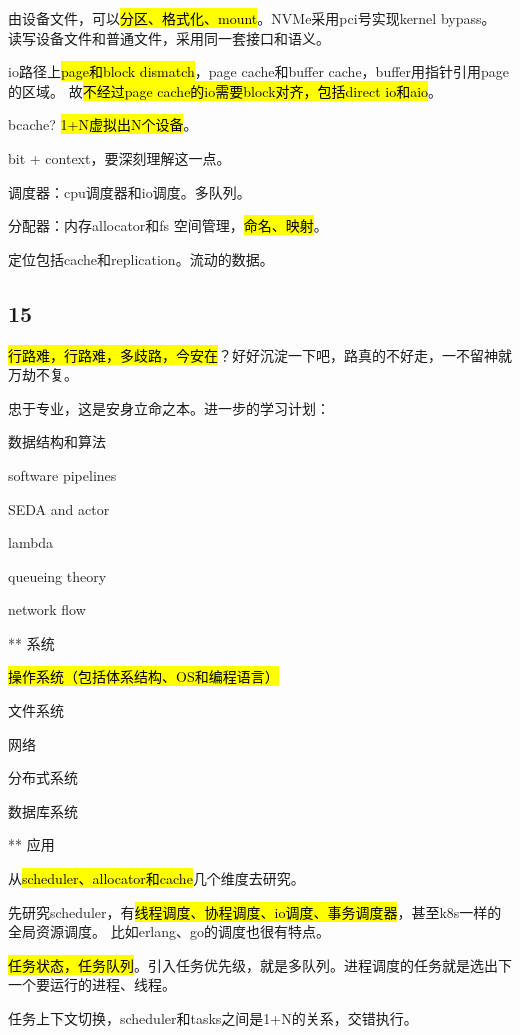 \hrulefill

由设备文件，可以\hl{分区、格式化、mount}。NVMe采用pci号实现kernel bypass。
读写设备文件和普通文件，采用同一套接口和语义。

io路径上\hl{page和block dismatch}，page cache和buffer cache，buffer用指针引用page的区域。
故\hl{不经过page cache的io需要block对齐，包括direct io和aio}。

bcache? \hl{1+N虚拟出N个设备}。

bit + context，要深刻理解这一点。

\hrulefill

调度器：cpu调度器和io调度。多队列。

分配器：内存allocator和fs 空间管理，\hl{命名、映射}。

定位包括cache和replication。流动的数据。

\subsection{15}

\hl{行路难，行路难，多歧路，今安在}？好好沉淀一下吧，路真的不好走，一不留神就万劫不复。

忠于专业，这是安身立命之本。进一步的学习计划：
\begin{enumbox}
\item 数据结构和算法
\item software pipelines
\item SEDA and actor
\item lambda
\item queueing theory
\item network flow
\item *** 系统
\item \hl{操作系统（包括体系结构、OS和编程语言）}
\item 文件系统
\item 网络
\item 分布式系统
\item 数据库系统
\item *** 应用
\end{enumbox}

从\hl{scheduler、allocator和cache}几个维度去研究。

先研究scheduler，有\hl{线程调度、协程调度、io调度、事务调度器}，甚至k8s一样的全局资源调度。
比如erlang、go的调度也很有特点。

\hl{任务状态，任务队列}。引入任务优先级，就是多队列。进程调度的任务就是选出下一个要运行的进程、线程。

任务上下文切换，scheduler和tasks之间是1+N的关系，交错执行。

